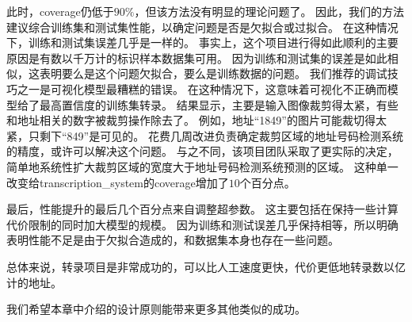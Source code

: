 此时，\gls{coverage}仍低于$90\%$，但该方法没有明显的理论问题了。
因此，我们的方法建议综合训练集和测试集性能，以确定问题是否是欠拟合或过拟合。
在这种情况下，训练和测试集误差几乎是一样的。
事实上，这个项目进行得如此顺利的主要原因是有数以千万计的标识样本数据集可用。
因为训练和测试集的误差是如此相似，这表明要么是这个问题欠拟合，要么是训练数据的问题。
我们推荐的调试技巧之一是可视化模型最糟糕的错误。
在这种情况下，这意味着可视化不正确而模型给了最高置信度的训练集转录。
结果显示，主要是输入图像裁剪得太紧，有些和地址相关的数字被裁剪操作除去了。
例如，地址``1849''的图片可能裁切得太紧，只剩下``849''是可见的。
花费几周改进负责确定裁剪区域的地址号码检测系统的精度，或许可以解决这个问题。
与之不同，该项目团队采取了更实际的决定，简单地系统性扩大裁剪区域的宽度大于地址号码检测系统预测的区域。
这种单一改变给\gls{transcription_system}的\gls{coverage}增加了$10$个百分点。


最后，性能提升的最后几个百分点来自调整超参数。
这主要包括在保持一些计算代价限制的同时加大模型的规模。
因为训练和测试误差几乎保持相等，所以明确表明性能不足是由于欠拟合造成的，和数据集本身也存在一些问题。


总体来说，转录项目是非常成功的，可以比人工速度更快，代价更低地转录数以亿计的地址。

我们希望本章中介绍的设计原则能带来更多其他类似的成功。

